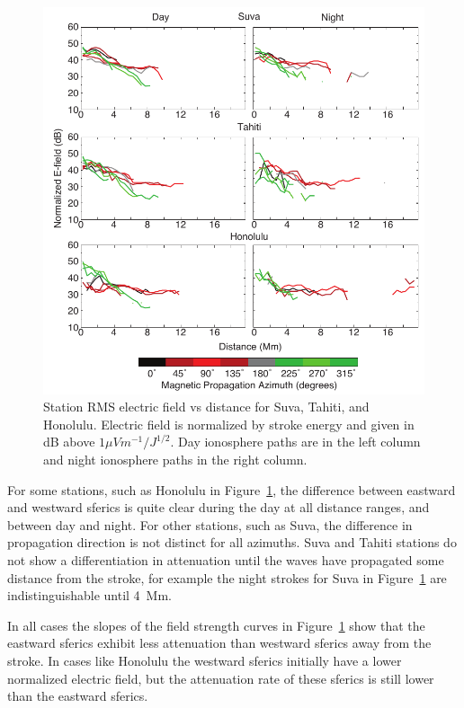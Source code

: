  \begin{figure}[h!t]
   \centering
   \includegraphics[scale=1]{Azimuth/Figures/e-field_3.pdf} 
   \caption{Station RMS electric field vs distance for Suva, Tahiti, and Honolulu.
   	Electric field is normalized by stroke energy and given in dB above $1 \mu Vm^{-1}/J^{1/2}$.
	Day ionosphere paths are in the left column and night ionosphere paths in the right column.}
   \label{azimuth:fig:azimuth}
\end{figure}

For some stations, such as Honolulu in Figure~\ref{azimuth:fig:azimuth}, the difference between eastward and westward sferics is quite clear during the day at all distance ranges, and between day and night.
For other stations, such as Suva, the difference in propagation direction is not distinct for all azimuths.
Suva and Tahiti stations do not show a differentiation in attenuation until the waves have propagated some distance from the stroke, for example the night strokes for Suva in Figure~\ref{azimuth:fig:azimuth} are indistinguishable until 4~Mm.

In all cases the slopes of the field strength curves in Figure~\ref{azimuth:fig:azimuth} show that the eastward sferics exhibit less attenuation than westward sferics away from the stroke.
In cases like Honolulu the westward sferics initially have a lower normalized electric field, but the attenuation rate of these sferics is still lower than the eastward sferics.
  
